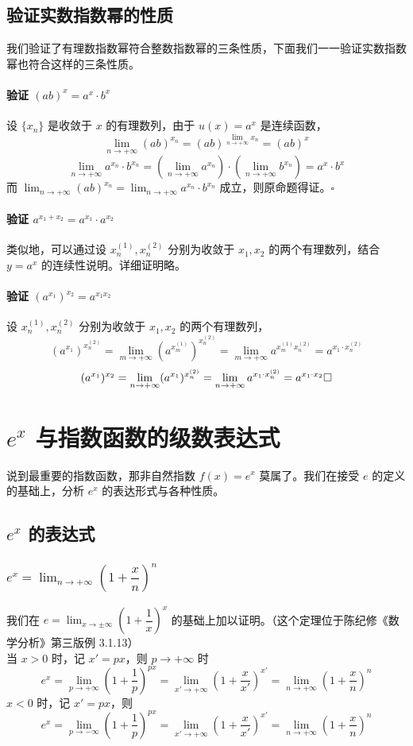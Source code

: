 \documentclass[UTF8,12pt]{ctexart}
\begin{document}
    \subsection{验证实数指数幂的性质}
        我们验证了有理数指数幂符合整数指数幂的三条性质，下面我们一一验证实数指数幂也符合这样的三条性质。
        \paragraph{验证 $(ab)^x = a^x\cdot b^x$}
            设 $\{x_n\}$ 是收敛于 $x$ 的有理数列，由于 $u(x) = a^x$ 是连续函数，$$
            \lim_{n \to +\infty}(ab)^{x_n} = (ab)^{\lim_{n \to +\infty} x_n} =(ab)^x
            $$
            $$
            \lim_{n \to +\infty}a^{x_n}\cdot b^{x_n} = (\lim_{n \to +\infty}a^{x_n})\cdot (\lim_{n \to +\infty}b^{x_n}) = a^x\cdot b^x
            $$
            而 $\lim_{n \to +\infty}(ab)^{x_n} = \lim_{n \to +\infty}a^{x_n}\cdot b^{x_n}$ 成立，则原命题得证。$\square$
        \paragraph{验证 $a^{x_1 + x_2} =a^{x_1}\cdot a^{x_2}$}
            类似地，可以通过设 $x_n^{(1)}, x_n^{(2)}$ 分别为收敛于 $x_1, x_2$ 的两个有理数列，结合 $y = a^x$ 的连续性说明。详细证明略。
        \paragraph{验证 $(a^{x_1})^{x_2} =a^{x_1 x_2}$}
            设 $x_n^{(1)}, x_n^{(2)}$ 分别为收敛于 $x_1, x_2$ 的两个有理数列，
            $$
            (a^{x_1})^{x_n^{(2)}} = \lim_{m \to +\infty} (a^{x_m^{(1)}})^{x_n^{(2)}} = \lim_{m \to +\infty} a^{x_m^{(1)} x_n^{(2)}} = a^{x_1\cdot x_n^{(2)}}
            $$
            $$
            (a^{x_1})^{x_2} = \lim_{n \to +\infty} (a^{x_1})^{x_n^{(2)}} = \lim_{n \to +\infty} a^{x_1\cdot x_n^{(2)}} = a^{x_1\cdot x_2}\space\space \square
            $$
\section{$e^x$ 与指数函数的级数表达式}
    说到最重要的指数函数，那非自然指数 $f(x) = e^x$ 莫属了。我们在接受 $e$ 的定义的基础上，分析 $e^x$ 的表达形式与各种性质。
    \subsection{$e^x$ 的表达式}
        \subsubsection{$e^x = \lim_{n \to +\infty}(1 + \dfrac x n)^n$}
            我们在 $e = \lim_{x \to \pm\infty} (1 + \dfrac 1 x)^x$ 的基础上加以证明。（这个定理位于陈纪修《数学分析》第三版例 3.1.13）\\
            当 $x > 0$ 时，记 $x' = px$，则 $p \to +\infty$ 时 $$
            e^x = \lim_{p\to +\infty}(1 + \dfrac 1 p)^{px} = \lim_{x' \to +\infty}(1 + \frac x {x'})^{x'} = \lim_{n \to +\infty}(1 + \frac x n)^n
            $$
            $x < 0$ 时，记 $x' = px$，则 $$
            e^x = \lim_{p \to -\infty}(1 + \dfrac 1 p)^{px} = \lim_{x'\to +\infty}(1 + \dfrac{x}{x'})^{x'} = \lim_{n \to +\infty}(1 + \frac x n)^n
            $$
\end{document}
